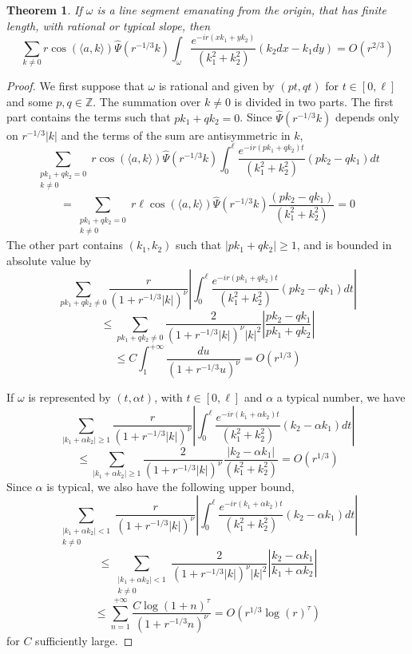 \documentclass[12pt]{amsart}
\numberwithin{equation}{subsection}
\theoremstyle{definition}
\theoremstyle{plain}
\newtheorem{theorem}[equation]{Theorem}
\begin{document}
\begin{theorem}
\label{lmb}
If $\omega$ is a line segment emanating from the origin, that has finite length, with rational or typical slope, then
\[
\sum_{k \neq 0} r
\cos(\langle a,k \rangle) \hat{\Psi}(r^{-1/3}k)
\int_{\omega} \frac{e^{-ir(x k_1 + y k_2)}}{(k_1^2 + k_2^2)}(k_2 dx - k_1 dy)
=O(r^{2/3})
\]
\end{theorem}
\begin{proof}
We first suppose that $\omega$ is rational and given by $(pt,qt)$ for $t \in [0,\ell]$ and some $p,q \in \mathbb Z$.
The summation over $k \neq 0$ is divided in two parts.
The first part contains the terms such that $p k_1 + q k_2 = 0$.
Since $\hat{\Psi}(r^{-1/3}k)$ depends only on $r^{-1/3}|k|$ and the terms of the sum are antisymmetric in $k$,
\[
\sum_{\substack{p k_1 + q k_2 = 0\\ k \neq 0}}
r \cos(\langle a,k \rangle) \hat{\Psi}(r^{-1/3}k)
\int_0^\ell \frac{e^{-ir(p k_1 + q k_2)t}}{(k_1^2 + k_2^2)} (p k_2 - q k_1) dt
\]
\[
= \sum_{\substack{p k_1 + q k_2 = 0\\ k \neq 0}}
r \ell \cos(\langle a,k \rangle) \hat{\Psi}(r^{-1/3}k) \frac{(p k_2 - q k_1)}{(k_1^2 + k_2^2)} = 0
\]
The other part contains $(k_1,k_2)$ such that $|p k_1 + q k_2| \geq 1$, and is bounded in absolute value by
\[
\sum_{p k_1 + q k_2 \neq 0} \frac{r}{(1+r^{-1/3}|k|)^\nu}
\left| \int_0^\ell \frac{e^{-ir(p k_1 + q k_2)t}}{(k_1^2 + k_2^2)} (p k_2 - q k_1) dt \right|
\]
\[
\leq  \sum_{p k_1 + q k_2 \neq 0} \frac{2}{(1+r^{-1/3}|k|)^\nu|k|^2}
\left| \frac{p k_2 - q k_1}{p k_1 + q k_2} \right|
\]
\[
\leq C \int_1^{+ \infty} \frac{du}{(1+r^{-1/3}u)^\nu} = O(r^{1/3})
\]

If $\omega$ is represented by $(t, \alpha t)$, with $t \in [0,\ell]$ and $\alpha$ a typical number,
we have
\[
\sum_{| k_1 + \alpha k_2| \geq 1} \frac{r}{(1+r^{-1/3}|k|)^\nu}
\left| \int_0^\ell \frac{e^{-ir( k_1 + \alpha k_2)t}}{(k_1^2 + k_2^2)} ( k_2 - \alpha k_1) dt \right|
\]
\[
\leq  \sum_{|k_1 + \alpha k_2| \geq 1} \frac{2}{(1+r^{-1/3}|k|)^\nu}
\frac{|k_2 - \alpha k_1|}{(k_1^2 + k_2^2)}
= O(r^{1/3})
\]
Since $\alpha$ is typical, we also have the following upper bound,
\[
\sum_{\substack{| k_1 + \alpha k_2| < 1\\ k \neq 0}} \frac{r}{(1+r^{-1/3}|k|)^\nu}
\left|
\int_0^\ell \frac{e^{-ir( k_1 + \alpha k_2)t}}{(k_1^2 + k_2^2)} ( k_2 - \alpha k_1) dt \right|
\]
\[
\leq
\sum_{\substack{| k_1 + \alpha k_2| < 1\\ k \neq 0}}
\frac{2}{(1+r^{-1/3}|k|)^\nu|k|^2}
\left| \frac{ k_2 - \alpha k_1}{ k_1 + \alpha k_2} \right|
\]
\[
\leq \sum_{n=1}^{+\infty}
\frac{C \log(1+n)^{\tau}}{(1+r^{-1/3}n)^\nu }  = O(r^{1/3}\log(r)^{\tau})
\]
for $C$ sufficiently large.
\end{proof}
\end{document}
